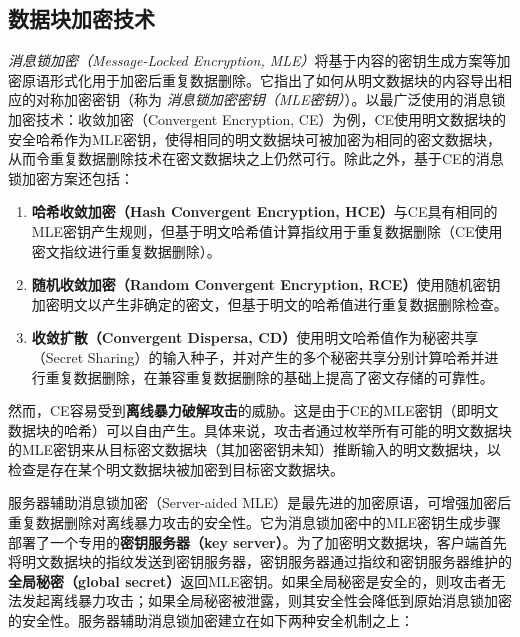 \subsection{数据块加密技术}
\label{subsec:background-encrypted-deduplication-key}

\textit{消息锁加密（Message-Locked Encryption, MLE）}\cite{bellare2013MLE}将基于内容的密钥生成方案等加密原语形式化用于加密后重复数据删除。它指出了如何从明文数据块的内容导出相应的对称加密密钥（称为 \textit{消息锁加密密钥（MLE密钥）}）。以最广泛使用的消息锁加密技术：收敛加密（Convergent Encryption, CE）\cite{douceur2002reclaiming}为例，CE使用明文数据块的安全哈希作为MLE密钥，使得相同的明文数据块可被加密为相同的密文数据块，从而令重复数据删除技术在密文数据块之上仍然可行。除此之外，基于CE的消息锁加密方案还包括：

\begin{enumerate}
    \item \textbf{哈希收敛加密（Hash Convergent Encryption, HCE）}\cite{douceur2002reclaiming}与CE具有相同的MLE密钥产生规则，但基于明文哈希值计算指纹用于重复数据删除（CE使用密文指纹进行重复数据删除）。
    \item \textbf{随机收敛加密（Random Convergent Encryption, RCE）}\cite{douceur2002reclaiming}使用随机密钥加密明文以产生非确定的密文，但基于明文的哈希值进行重复数据删除检查。
    \item \textbf{收敛扩散（Convergent Dispersa, CD）}\cite{li2016cdstore}使用明文哈希值作为秘密共享（Secret Sharing）的输入种子，并对产生的多个秘密共享分别计算哈希并进行重复数据删除，在兼容重复数据删除的基础上提高了密文存储的可靠性。
\end{enumerate}

然而，CE容易受到\textbf{离线暴力破解攻击}的威胁。这是由于CE的MLE密钥（即明文数据块的哈希）可以自由产生。具体来说，攻击者通过枚举所有可能的明文数据块的MLE密钥来从目标密文数据块（其加密密钥未知）推断输入的明文数据块，以检查是存在某个明文数据块被加密到目标密文数据块。

服务器辅助消息锁加密（Server-aided MLE）\cite{bellare2013DupLESS}是最先进的加密原语，可增强加密后重复数据删除对离线暴力攻击的安全性。它为消息锁加密中的MLE密钥生成步骤部署了一个专用的\textbf{密钥服务器（key server）}。为了加密明文数据块，客户端首先将明文数据块的指纹发送到密钥服务器，密钥服务器通过指纹和密钥服务器维护的\textbf{全局秘密（global secret）}返回MLE密钥。如果全局秘密是安全的，则攻击者无法发起离线暴力攻击；如果全局秘密被泄露，则其安全性会降低到原始消息锁加密的安全性。服务器辅助消息锁加密建立在如下两种安全机制之上：

